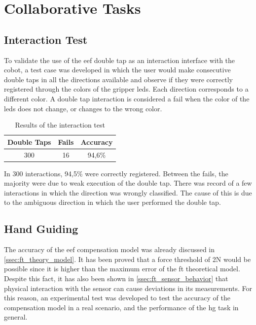 \section{Collaborative Tasks}

\subsection{Interaction Test}

\par To validate the use of the \ac{eef} double tap as an interaction interface with the cobot, a test case was developed in which the user would make consecutive double taps in all the directions available and observe if they were correctly registered through the colors of the gripper \acsp{led}. Each direction corresponds to a different color. A double tap interaction is considered a fail when the color of the \acsp{led} does not change, or changes to the wrong color.

\begin{table}[h]
    \centering
    \begin{tabular}{|c|c|c|}
    \hline
    \textbf{Double Taps} & \textbf{Fails} & \textbf{Accuracy} \\ \hline
    300 & 16 & 94,6\% \\ \hline
    \end{tabular}
    \caption{Results of the interaction test}
    \label{tab:interaction_test}
\end{table}

\par In 300 interactions, 94,5\% were correctly registered. Between the fails, the majority were due to weak execution of the double tap. There was record of a few interactions in which the direction was wrongly classified. The cause of this is due to the ambiguous direction in which the user performed the double tap.

\subsection{Hand Guiding}

\par The accuracy of the \ac{eef} compensation model was already discussed in \autoref{ssec:ft_theory_model}. It has been proved that a force threshold of 2N would be possible since it is higher than the maximum error of the \ac{ft} theoretical model. Despite this fact, it has also been shown in \autoref{ssec:ft_sensor_behavior} that physical interaction with the sensor can cause deviations in its measurements. For this reason, an experimental test was developed to test the accuracy of the compensation model in a real scenario, and the performance of the \ac{hg} task in general.

